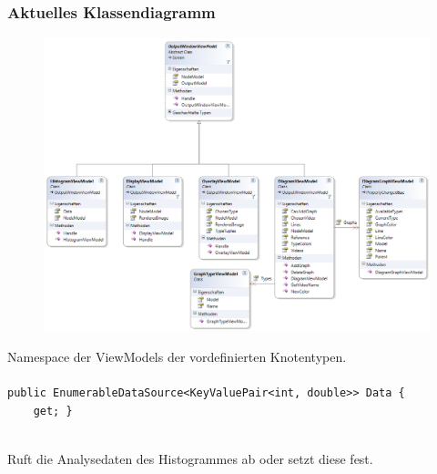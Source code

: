 \subsection{}

\subsubsection*{Aktuelles Klassendiagramm}
\begin{figure}[h!]
\begin{center}
\includegraphics[width=\textwidth]{classdiagram/viewmodel-imp.png}
\end{center}
\end{figure}
Namespace der ViewModels der vordefinierten Knotentypen.
\newpage

\paragraph{}
\begin{itemize}
	\add \begin{verbatim}public EnumerableDataSource<KeyValuePair<int, double>> Data {
    get; }\end{verbatim} \\
	Ruft die Analysedaten des Histogrammes ab oder setzt diese fest.
\end{itemize}


